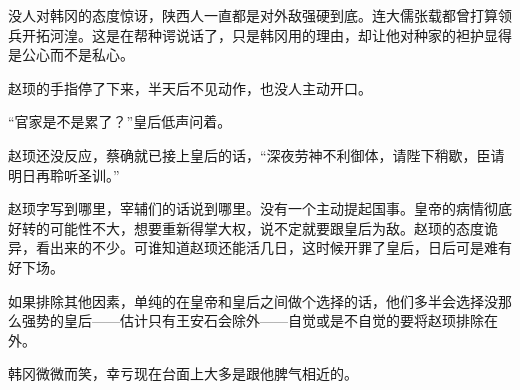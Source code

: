 没人对韩冈的态度惊讶，陕西人一直都是对外敌强硬到底。连大儒张载都曾打算领兵开拓河湟。这是在帮种谔说话了，只是韩冈用的理由，却让他对种家的袒护显得是公心而不是私心。

赵顼的手指停了下来，半天后不见动作，也没人主动开口。

“官家是不是累了？”皇后低声问着。

赵顼还没反应，蔡确就已接上皇后的话，“深夜劳神不利御体，请陛下稍歇，臣请明日再聆听圣训。”

赵顼字写到哪里，宰辅们的话说到哪里。没有一个主动提起国事。皇帝的病情彻底好转的可能性不大，想要重新得掌大权，说不定就要跟皇后为敌。赵顼的态度诡异，看出来的不少。可谁知道赵顼还能活几日，这时候开罪了皇后，日后可是难有好下场。

如果排除其他因素，单纯的在皇帝和皇后之间做个选择的话，他们多半会选择没那么强势的皇后——估计只有王安石会除外——自觉或是不自觉的要将赵顼排除在外。

韩冈微微而笑，幸亏现在台面上大多是跟他脾气相近的。
